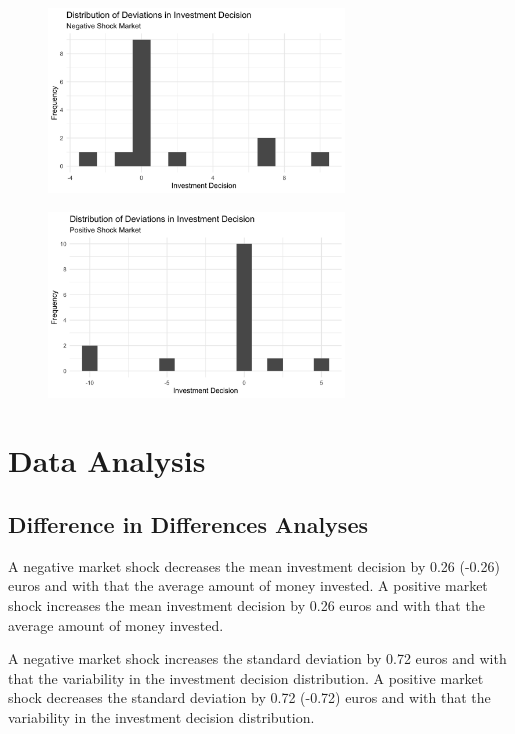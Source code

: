 \documentclass[12pt, a4paper]{article}
\theoremstyle{remark}
\begin{document}
\begin{figure}[H]
	\centering
	\includegraphics[width=0.7\textwidth]{investment-decision-deviations-negative-market-distribution}
\end{figure}

\begin{figure}[H]
	\centering
	\includegraphics[width=0.7\textwidth]{investment-decision-deviations-positive-market-distribution}
\end{figure}


\section{Data Analysis}

\subsection{Difference in Differences Analyses}

A negative market shock decreases the mean investment decision by 0.26 (-0.26) euros and with that the average amount of money invested. A positive market shock increases the mean investment decision by 0.26 euros and with that the average amount of money invested.

A negative market shock increases the standard deviation by 0.72 euros and with that the variability in the investment decision distribution. A positive market shock decreases the standard deviation by 0.72 (-0.72) euros and with that the variability in the investment decision distribution.
\end{document}
